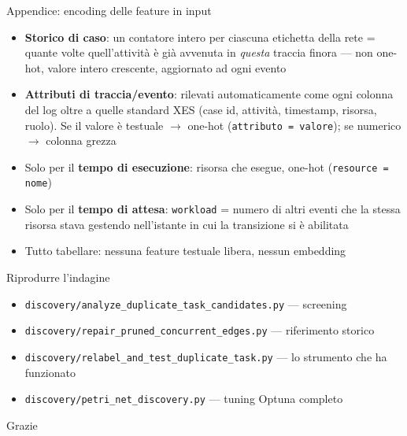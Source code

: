 \documentclass[11pt,aspectratio=169]{beamer}
\begin{document}
\begin{frame}{Appendice: encoding delle feature in input}
\begin{itemize}
\item \textbf{Storico di caso}: un contatore intero per ciascuna etichetta della rete = quante volte quell'attivit\`a \`e gi\`a avvenuta in \emph{questa} traccia finora --- non one-hot, valore intero crescente, aggiornato ad ogni evento
\item \textbf{Attributi di traccia/evento}: rilevati automaticamente come ogni colonna del log oltre a quelle standard XES (case id, attivit\`a, timestamp, risorsa, ruolo). Se il valore \`e testuale $\to$ one-hot (\texttt{attributo = valore}); se numerico $\to$ colonna grezza
\item Solo per il \textbf{tempo di esecuzione}: risorsa che esegue, one-hot (\texttt{resource = nome})
\item Solo per il \textbf{tempo di attesa}: \texttt{workload} = numero di altri eventi che la stessa risorsa stava gestendo nell'istante in cui la transizione si \`e abilitata
\item Tutto tabellare: nessuna feature testuale libera, nessun embedding
\end{itemize}
\end{frame}


\begin{frame}{Riprodurre l'indagine}
\begin{itemize}
\item \texttt{discovery/analyze\_duplicate\_task\_candidates.py} --- screening
\item \texttt{discovery/repair\_pruned\_concurrent\_edges.py} --- riferimento storico
\item \texttt{discovery/relabel\_and\_test\_duplicate\_task.py} --- lo strumento che ha funzionato
\item \texttt{discovery/petri\_net\_discovery.py} --- tuning Optuna completo
\end{itemize}
\vspace{1em}
\centering\Large\color{accent} Grazie
\end{frame}
\end{document}
